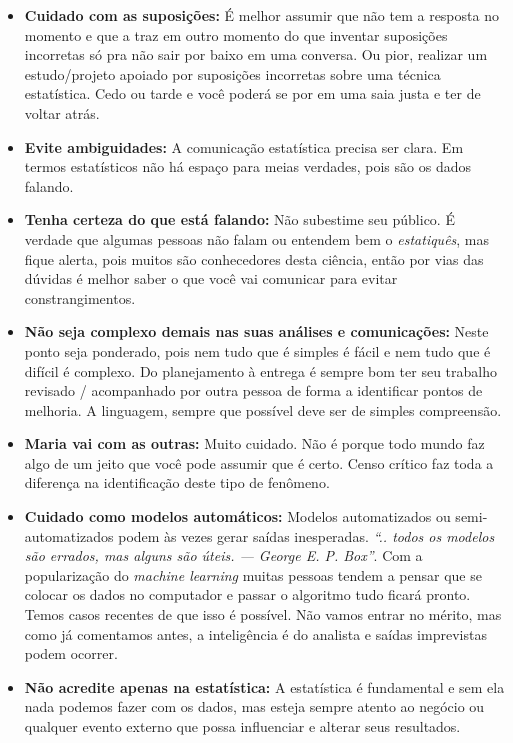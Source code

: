 \documentclass[11pt,]{style/krantz}
\theoremstyle{definition}
\theoremstyle{definition}
\theoremstyle{definition}
\theoremstyle{remark}
\begin{document}
\begin{itemize}
\item
  \textbf{Cuidado com as suposições:} É melhor assumir que não tem a resposta no momento e que a traz em outro momento do que inventar suposições incorretas só pra não sair por baixo em uma conversa. Ou pior, realizar um estudo/projeto apoiado por suposições incorretas sobre uma técnica estatística. Cedo ou tarde e você poderá se por em uma saia justa e ter de voltar atrás.
\item
  \textbf{Evite ambiguidades:} A comunicação estatística precisa ser clara. Em termos estatísticos não há espaço para meias verdades, pois são os dados falando.
\item
  \textbf{Tenha certeza do que está falando:} Não subestime seu público. É verdade que algumas pessoas não falam ou entendem bem o \emph{estatiquês}, mas fique alerta, pois muitos são conhecedores desta ciência, então por vias das dúvidas é melhor saber o que você vai comunicar para evitar constrangimentos.
\item
  \textbf{Não seja complexo demais nas suas análises e comunicações:} Neste ponto seja ponderado, pois nem tudo que é simples é fácil e nem tudo que é difícil é complexo. Do planejamento à entrega é sempre bom ter seu trabalho revisado / acompanhado por outra pessoa de forma a identificar pontos de melhoria. A linguagem, sempre que possível deve ser de simples compreensão.
\item
  \textbf{Maria vai com as outras:} Muito cuidado. Não é porque todo mundo faz algo de um jeito que você pode assumir que é certo. Censo crítico faz toda a diferença na identificação deste tipo de fenômeno.
\item
  \textbf{Cuidado como modelos automáticos:} Modelos automatizados ou semi-automatizados podem às vezes gerar saídas inesperadas. \emph{``.. todos os modelos são errados, mas alguns são úteis. --- George E. P. Box''}. Com a popularização do \emph{machine learning}
  muitas pessoas tendem a pensar que se colocar os dados no computador e passar o algoritmo tudo ficará pronto. Temos casos recentes de que isso é possível. Não vamos entrar no mérito, mas como já comentamos antes, a inteligência é do analista e saídas imprevistas podem ocorrer.
\item
  \textbf{Não acredite apenas na estatística:} A estatística é fundamental e sem ela nada podemos fazer com os dados, mas esteja sempre atento ao negócio ou qualquer evento externo que possa influenciar e alterar seus resultados.
\end{itemize}
\end{document}
